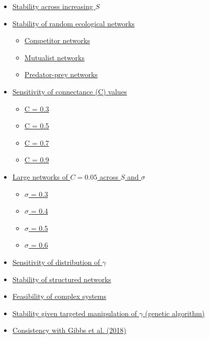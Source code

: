\documentclass[]{article}
\providecommand{\tightlist}{%
  \setlength{\itemsep}{0pt}\setlength{\parskip}{0pt}}
\begin{document}
\begin{itemize}
\tightlist
\item
  \protect\hyperlink{IncrS}{Stability across increasing \(S\)}
\item
  \protect\hyperlink{ecological}{Stability of random ecological
  networks}

  \begin{itemize}
  \tightlist
  \item
    \protect\hyperlink{competition}{Competitor networks}
  \item
    \protect\hyperlink{mutualism}{Mutualist networks}
  \item
    \protect\hyperlink{pred-prey}{Predator-prey networks}
  \end{itemize}
\item
  \protect\hyperlink{connectance}{Sensitivity of connectance (C) values}

  \begin{itemize}
  \tightlist
  \item
    \protect\hyperlink{connect3}{C = 0.3}
  \item
    \protect\hyperlink{connect5}{C = 0.5}
  \item
    \protect\hyperlink{connect7}{C = 0.7}
  \item
    \protect\hyperlink{connect9}{C = 0.9}
  \end{itemize}
\item
  \protect\hyperlink{sigma}{Large networks of \(C = 0.05\) across \(S\)
  and \(\sigma\)}

  \begin{itemize}
  \tightlist
  \item
    \protect\hyperlink{sigma3}{\(\sigma\) = 0.3}
  \item
    \protect\hyperlink{sigma4}{\(\sigma\) = 0.4}
  \item
    \protect\hyperlink{sigma5}{\(\sigma\) = 0.5}
  \item
    \protect\hyperlink{sigma6}{\(\sigma\) = 0.6}
  \end{itemize}
\item
  \protect\hyperlink{gam_dist}{Sensitivity of distribution of
  \(\gamma\)}
\item
  \protect\hyperlink{structured}{Stability of structured networks}
\item
  \protect\hyperlink{Feasibility}{Feasibility of complex systems}
\item
  \protect\hyperlink{ga}{Stability given targeted manipulation of
  \(\gamma\) (genetic algorithm)}
\item
  \protect\hyperlink{Gibbs}{Consistency with Gibbs et al. (2018)}
\end{itemize}
\end{document}
